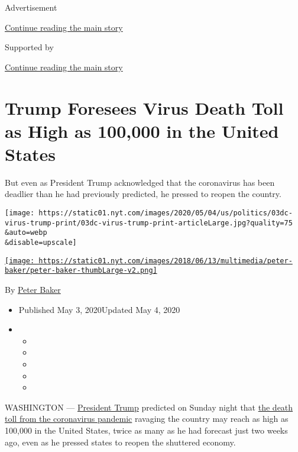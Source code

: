 Advertisement

\protect\hyperlink{after-top}{Continue reading the main story}

Supported by

\protect\hyperlink{after-sponsor}{Continue reading the main story}

\hypertarget{trump-foresees-virus-death-toll-as-high-as-100000-in-the-united-states}{%
\section{Trump Foresees Virus Death Toll as High as 100,000 in the
United
States}\label{trump-foresees-virus-death-toll-as-high-as-100000-in-the-united-states}}

But even as President Trump acknowledged that the coronavirus has been
deadlier than he had previously predicted, he pressed to reopen the
country.

\texttt{[image: https://static01.nyt.com/images/2020/05/04/us/politics/03dc-virus-trump-print/03dc-virus-trump-print-articleLarge.jpg?quality=75\\\&auto=webp\\\&disable=upscale]}

\href{https://www.nytimes.com/by/peter-baker}{\texttt{[image: https://static01.nyt.com/images/2018/06/13/multimedia/peter-baker/peter-baker-thumbLarge-v2.png]}}

By \href{https://www.nytimes.com/by/peter-baker}{Peter Baker}

\begin{itemize}
\item
  Published May 3, 2020Updated May 4, 2020
\item
  \begin{itemize}
  \item
  \item
  \item
  \item
  \item
  \end{itemize}
\end{itemize}

WASHINGTON ---
\href{https://www.nytimes.com/2020/05/04/us/politics/trump-coronavirus-death-toll.html}{President
Trump} predicted on Sunday night that
\href{https://www.nytimes.com/interactive/2020/us/coronavirus-us-cases.html}{the
death toll from the coronavirus pandemic} ravaging the country may reach
as high as 100,000 in the United States, twice as many as he had
forecast just two weeks ago, even as he pressed states to reopen the
shuttered economy.

